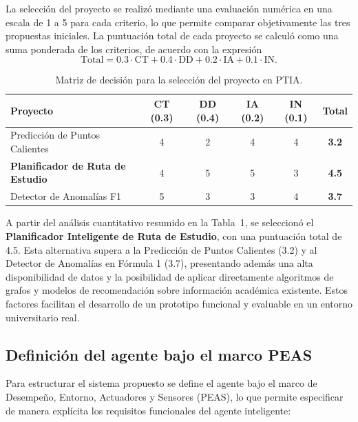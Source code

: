 La selección del proyecto se realizó mediante una evaluación numérica en una escala de 1 a 5 para cada criterio, lo que permite comparar objetivamente las tres propuestas iniciales. La puntuación total de cada proyecto se calculó como una suma ponderada de los criterios, de acuerdo con la expresión
$$
\text{Total} = 0.3 \cdot \text{CT} + 0.4 \cdot \text{DD} + 0.2 \cdot \text{IA} + 0.1 \cdot \text{IN}.
$$

\begin{table}[h!]
\centering
\begin{tabular}{|l|c|c|c|c|c|}
\hline
\textbf{Proyecto} & \textbf{CT (0.3)} & \textbf{DD (0.4)} & \textbf{IA (0.2)} & \textbf{IN (0.1)} & \textbf{Total} \\ \hline
Predicción de Puntos Calientes & 4 & 2 & 4 & 4 & \textbf{3.2} \\ \hline
\textbf{Planificador de Ruta de Estudio} & 4 & 5 & 5 & 3 & \textbf{4.5} \\ \hline
Detector de Anomalías F1 & 5 & 3 & 3 & 4 & \textbf{3.7} \\ \hline
\end{tabular}
\caption{Matriz de decisión para la selección del proyecto en PTIA.}
\end{table}

A partir del análisis cuantitativo resumido en la Tabla~1, se seleccionó el \textbf{Planificador Inteligente de Ruta de Estudio}, con una puntuación total de 4.5. Esta alternativa supera a la Predicción de Puntos Calientes (3.2) y al Detector de Anomalías en Fórmula 1 (3.7), presentando además una alta disponibilidad de datos y la posibilidad de aplicar directamente algoritmos de grafos y modelos de recomendación sobre información académica existente. Estos factores facilitan el desarrollo de un prototipo funcional y evaluable en un entorno universitario real.

\subsection{Definición del agente bajo el marco PEAS}

Para estructurar el sistema propuesto se define el agente bajo el marco de Desempeño, Entorno, Actuadores y Sensores (PEAS), lo que permite especificar de manera explícita los requisitos funcionales del agente inteligente:


